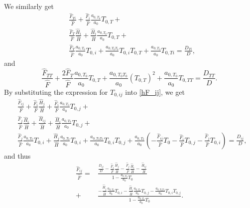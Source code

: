 \documentclass[english]{../thermomemo/thermomemo}
\newcommand*{\hF}[0]{\hat F}
\newcommand*{\hH}[0]{\hat H}
\newcommand{\lp}{\left(}
\newcommand{\rp}{\right)}
\numberwithin{equation}{section}
\begin{document}
We similarly get
\begin{equation}
  \label{hF_Ti}
  \begin{aligned}
    &\frac{\hF_{Ti}}{\hF} + \frac{\hF_i}{\hF}\frac{a_{0,T_0}}{a_0} T_{0,T} + \\
    &\frac{\hF_{T}}{\hF} \frac{\hH_i}{\hH} + \frac{\hH_i}{\hH}\frac{a_{0,T_0}}{a_0} T_{0,T} + \\
    &\frac{\hF_T}{\hF}\frac{a_{0,T_0}}{a_0} T_{0,i} +
    \frac{a_{0,T_0T_0}}{a_0} T_{0,i} T_{0,T} + \frac{a_{0,T_0}}{a_0}
    T_{0,Ti} = \frac{D_{Ti}}{D},
  \end{aligned}
\end{equation}
and
\begin{equation}
  \label{hF_TT}
  \frac{\hF_{TT}}{\hF} + \frac{2\hF_T}{\hF}\frac{a_{0,T_0}}{a_0} T_{0,T} + \frac{a_{0,T_0T_0}}{a_0} (T_{0,T})^2 + \frac{a_{0,T_0}}{a_0} T_{0,TT} = \frac{D_{TT}}{D}.
\end{equation}
By substituting the expression for $T_{0,ij}$ into \eqref{hF_ij}, we
get
\begin{align*}
  &\frac{\hF_{ij}}{\hF} + \frac{\hF_i}{\hF}\frac{\hH_j}{\hH} + \frac{\hF_i}{\hF}\frac{a_{0,T_0}}{a_0} T_{0,j} + \\
  &\frac{\hF_{j}}{\hF} \frac{\hH_i}{\hH} + \frac{\hH_{ij}}{\hH} + \frac{\hH_i}{\hH}\frac{a_{0,T_0}}{a_0} T_{0,j} + \\
  &\frac{\hF_j}{\hF}\frac{a_{0,T_0}}{a_0} T_{0,i} +
  \frac{\hH_j}{\hH}\frac{a_{0,T_0}}{a_0} T_{0,i} +
  \frac{a_{0,T_0T_0}}{a_0} T_{0,i} T_{0,j} + \frac{a_{0,T_0}}{a_0} \lp
  -\frac{\hF_{ij}}{\hF} T_0 - \frac{\hF_i}{\hF} T_{0,j} -
  \frac{\hF_j}{\hF} T_{0,i} \rp = \frac{D_{ij}}{D},
\end{align*}
and thus
\begin{equation}
  \begin{aligned}
    \frac{\hF_{ij}}{\hF} =& \frac{ \frac{D_{ij}}{D} - \frac{\hF_i}{\hF}\frac{\hH_j}{\hH} - \frac{\hF_{j}}{\hF} \frac{\hH_i}{\hH} - \frac{\hH_{ij}}{\hH} }{1-\frac{a_{0,T_0}}{a_0} T_0} \\
    +& \frac{-\frac{\hH_j}{\hH}\frac{a_{0,T_0}}{a_0} T_{0,i} -
      \frac{\hH_i}{\hH}\frac{a_{0,T_0}}{a_0} T_{0,j} -
      \frac{a_{0,T_0T_0}}{a_0} T_{0,i}
      T_{0,j}}{1-\frac{a_{0,T_0}}{a_0} T_0}.
  \end{aligned}
\end{equation}
\end{document}
